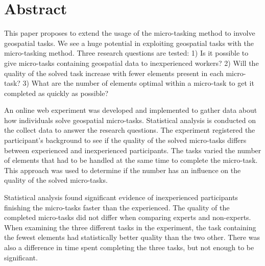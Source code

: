 \chapter*{Abstract}
%

This paper proposes to extend the usage of the micro-tasking method to involve geospatial tasks. We see a huge potential in exploiting geospatial tasks with the micro-tasking method. Three research questions are tested: 1) Is it possible to give micro-tasks containing geospatial data to inexperienced workers? 2) Will the quality of the solved task increase with fewer elements present in each micro-task? 3) What are the number of elements optimal within a micro-task to get it completed as quickly as possible?

An online web experiment was developed and implemented to gather data about how individuals solve geospatial micro-tasks. Statistical analysis is conducted on the collect data to answer the research questions. The experiment registered the participant's background to see if the quality of the solved micro-tasks differs between experienced and inexperienced participants. The tasks varied the number of elements that had to be handled at the same time to complete the micro-task. This approach was used to determine if the number has an influence on the quality of the solved micro-tasks. 

Statistical analysis found significant evidence of inexperienced participants finishing the micro-tasks faster than the experienced. The quality of the completed micro-tasks did not differ when comparing experts and non-experts. When examining the three different tasks in the experiment, the task containing the fewest elements had statistically better quality than the two other. There was also a difference in time spent completing the three tasks, but not enough to be significant. 

